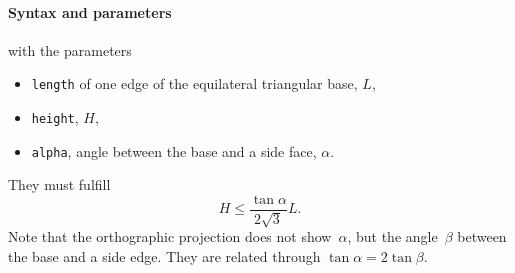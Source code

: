 \begin{figure}[h]
\hfill
{}
\hfill
{}
\hfill
{}
\hfill
\end{figure}

\FloatBarrier

\paragraph{Syntax and parameters}
\begin{quote}
\end{quote}
with the parameters
\begin{itemize}
\item \texttt{length} of one edge of the equilateral triangular base, $L$,
\item \texttt{height}, $H$,
\item \texttt{alpha}, angle between the base and a side face, $\alpha$.
\end{itemize}
They must fulfill
\begin{displaymath}
  H\le \frac{\tan{\alpha}}{2\sqrt{3}} L.
\end{displaymath}
Note that the orthographic projection does not show~$\alpha$,
but the angle~$\beta$ between the base and a side edge.
They are related through $\tan \alpha = 2 \tan \beta$. 


